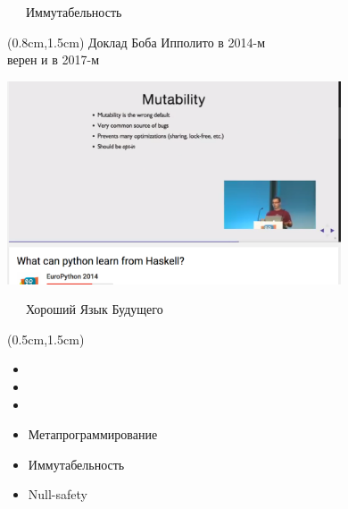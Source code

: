 \documentclass[xetex,18pt,aspectratio=43]{beamer}
\begin{document}
\begin{Large}
\begin{frame}{\ \ \ Иммутабельность}
\begin{textblock*}{\framewidth}(0.8cm,1.5cm)
Доклад Боба Ипполито в 2014-м\\
{\small верен и в 2017-м}
\begin{minipage}{\textwidth}
  \centering
  \includegraphics[height=6.0cm]{img/bobippolito}
\end{minipage}
\end{textblock*}
\end{frame}

\begin{frame}{\ \ \ Хороший Язык Будущего}
\begin{textblock*}{\framewidth-0.8cm}(0.5cm,1.5cm)
\begin{itemize}
  \item {\color{gray}{Строгая типизация (PHP и JS - плохие)}}
  \item {\color{gray}{(Опциональная) статическая типизация}}
  \item {\color{gray}{Package/vendoring manager}}
  \item Метапрограммирование
  \item Иммутабельность
  \item Null-safety
\end{itemize}
\end{textblock*}
\end{frame}


\end{Large}
\end{document}
